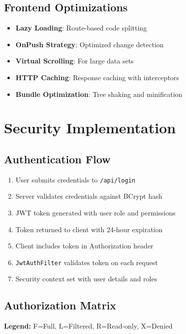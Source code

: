 \documentclass[11pt,a4paper]{article}
\begin{document}
\subsection{Frontend Optimizations}

\begin{itemize}[leftmargin=*]
    \item \textbf{Lazy Loading}: Route-based code splitting
    \item \textbf{OnPush Strategy}: Optimized change detection
    \item \textbf{Virtual Scrolling}: For large data sets
    \item \textbf{HTTP Caching}: Response caching with interceptors
    \item \textbf{Bundle Optimization}: Tree shaking and minification
\end{itemize}

\section{Security Implementation}

\subsection{Authentication Flow}

\begin{enumerate}[leftmargin=*]
    \item User submits credentials to \texttt{/api/login}
    \item Server validates credentials against BCrypt hash
    \item JWT token generated with user role and permissions
    \item Token returned to client with 24-hour expiration
    \item Client includes token in Authorization header
    \item \texttt{JwtAuthFilter} validates token on each request
    \item Security context set with user details and roles
\end{enumerate}

\subsection{Authorization Matrix}

\textbf{Legend:} F=Full, L=Filtered, R=Read-only, X=Denied
\end{document}
